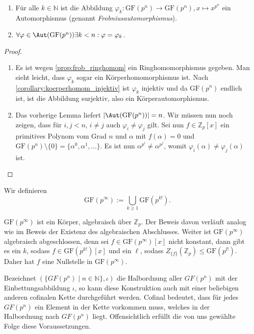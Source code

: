 \begin{theorem}{\ }
    \begin{enumerate}
        \item Für alle $k\in\mathbb{N}$ ist die Abbildung $\varphi_k: \mathrm{GF}(p^n) \to \mathrm{GF}(p^n), x \mapsto x^{p^n}$ ein Automorphismus (genannt \emph{Frobniusautomorphismus}). 
        \item $\forall \varphi \in \Aut(\mathrm{GF}(p^n)) \exists k < n: \varphi = \varphi_k$.
    \end{enumerate}
\end{theorem}
\begin{proof}{\ }
    \begin{enumerate}
        \item Es ist wegen \cref*{prop:frob_ringhomom} ein Ringhomomorphismus gegeben. Man sieht leicht, dass $\varphi_k$ sogar ein Körperhomomorphismus ist. Nach \cref*{corollary:koerperhomom_injektiv} ist $\varphi_k$ injektiv und da $\mathrm{GF}(p^n)$ endlich ist, ist die Abbildung surjektiv, also ein Körperautomorphismus.
        
        \item Das vorherige Lemma liefert $\vert \Aut(\mathrm{GF}(p^n)) \vert = n$. Wir müssen nun noch zeigen, dass für $i, j < n$, $i \not= j$ auch $\varphi_i \not= \varphi_j$ gilt. Sei nun $f \in \mathbb{Z}_p[x]$ ein primitives Polynom vom Grad $n$ und $\alpha$ mit $f(\alpha) = 0$ und $\mathrm{GF}(p^n)\setminus\{0\} = \{\alpha^0, \alpha^1, \ldots\}$. Es ist nun $\alpha^{p^i} \not= \alpha^{p^j}$, womit $\varphi_i(\alpha) \not= \varphi_j(\alpha)$ ist.
    \end{enumerate}
\end{proof}

\begin{definition}
    Wir definieren 
        $$ \mathrm{GF}\left(p^\infty\right) := \bigcup_{k \ge 1} \mathrm{GF}\left(p^{k!}\right). $$
\end{definition}
\begin{remark}
    $\mathrm{GF}(p^\infty)$ ist ein Körper, algebraisch über $\mathbb{Z}_p$. Der Beweis davon verläuft analog wie im Beweis der Existenz des algebraischen Abschlusses. Weiter ist $\mathrm{GF}(p^\infty)$ algebraisch abgeschlossen, denn sei $f \in \mathrm{GF}(p^\infty)[x]$ nicht konstant, dann gibt es ein $k$, sodass $f \in \mathrm{GF}(p^{k!})[x]$ und ein $\mathbb{\ell}$, sodass $Z_{\{f\}}(\mathbb{Z}_p) \le \mathrm{GF}(p^{l!})$. Daher hat $f$ eine Nullstelle in $\mathrm{GF}(p^\infty)$.

    Bezeichnet $(\{GF(p^{n})\mid n\in\mathbb{N}\},\iota)$ die Halbordnung aller $GF(p^n)$ mit der Einbettungsabbildung $\iota$, so kann diese Konstruktion auch mit einer beliebigen anderen cofinalen Kette durchgeführt werden. Cofinal bedeutet, dass für jedes $GF(p^n)$ ein Element in der Kette vorkommen muss, welches in der Halbordnung nach $GF(p^n)$ liegt. Offensichtlich erfüllt die von uns gewählte Folge diese Voraussetzungen.
\end{remark}